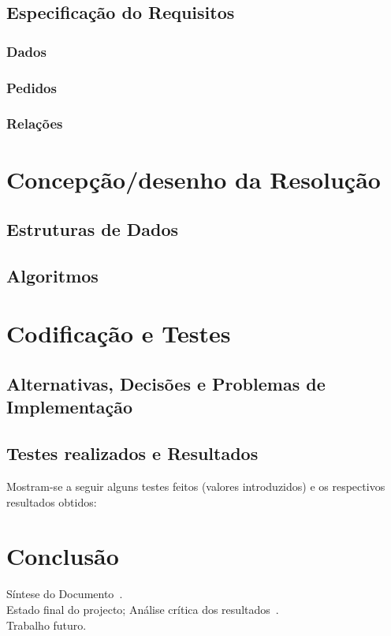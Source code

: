 \documentclass[11pt,a4paper]{report}%
\begin{document}
\section{Especificação do Requisitos}
\subsection{Dados} \label{subsec:dados} %
\subsection{Pedidos}
\subsection{Relações}

\chapter{Concepção/desenho da Resolução}
\section{Estruturas de Dados}
\section{Algoritmos}

\chapter{Codificação e Testes}
\section{Alternativas, Decisões e Problemas de Implementação}
\section{Testes realizados e Resultados}
Mostram-se a seguir alguns testes feitos (valores introduzidos) e
os respectivos resultados obtidos:


\chapter{Conclusão} \label{concl}
Síntese do Documento~\cite{araujo:2018,martini:2018}.\\
Estado final do projecto; Análise crítica dos resultados~\cite{Sto77a}.\\
Trabalho futuro.
\end{document}

